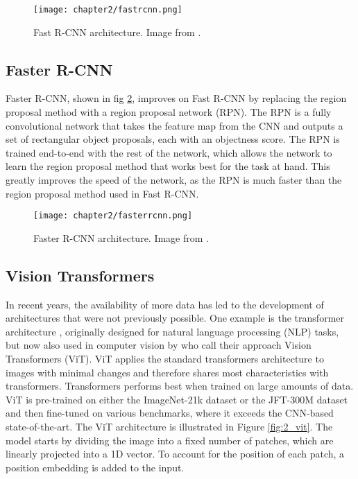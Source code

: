 \begin{figure}[H]
	\centering
	\texttt{[image: chapter2/fastrcnn.png]}
	\caption{\label{fig:2_fastrcnn} Fast R-CNN architecture. Image from \citet{fastrcnn}.}
\end{figure}

\subsection{Faster R-CNN \cite{fasterrcnn}}
Faster R-CNN, shown in fig \ref{fig:2_fasterrcnn}, improves on Fast R-CNN by replacing the region proposal method with a region proposal network (RPN). The RPN is a fully convolutional network that takes the feature map from the CNN and outputs a set of rectangular object proposals, each with an objectness score. The RPN is trained end-to-end with the rest of the network, which allows the network to learn the region proposal method that works best for the task at hand. This greatly improves the speed of the network, as the RPN is much faster than the region proposal method used in Fast R-CNN.

\begin{figure}[H]
	\centering
	\texttt{[image: chapter2/fasterrcnn.png]}
	\caption{\label{fig:2_fasterrcnn} Faster R-CNN architecture. Image from \citet{fasterrcnn}.}
\end{figure}

\subsection{Vision Transformers \cite{vit}}
In recent years, the availability of more data has led to the development of architectures that were not previously possible. One example is the transformer architecture \cite{transformers}, originally designed for natural language processing (NLP) tasks, but now also used in computer vision by \citet{vit} who call their approach Vision Transformers (ViT). ViT applies the standard transformers architecture to images with minimal changes and therefore shares most characteristics with transformers. Transformers performs best when trained on large amounts of data. ViT is pre-trained on either the ImageNet-21k dataset or the JFT-300M dataset and then fine-tuned on various benchmarks, where it exceeds the CNN-based state-of-the-art. The ViT architecture is illustrated in Figure \ref{fig:2_vit}. The model starts by dividing the image into a fixed number of patches, which are linearly projected into a 1D vector. To account for the position of each patch, a position embedding is added to the input.

